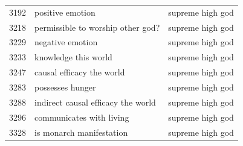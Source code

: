 \begin{tabular}{rll}
3192 & positive emotion & supreme high god \\
3218 & permissible to worship other god? & supreme high god \\
3229 & negative emotion & supreme high god \\
3233 & knowledge this world & supreme high god \\
3247 & causal efficacy the world & supreme high god \\
3283 & possesses hunger & supreme high god \\
3288 & indirect causal efficacy the world & supreme high god \\
3296 & communicates with living & supreme high god \\
3328 & is monarch manifestation & supreme high god \\
\bottomrule
\end{tabular}
